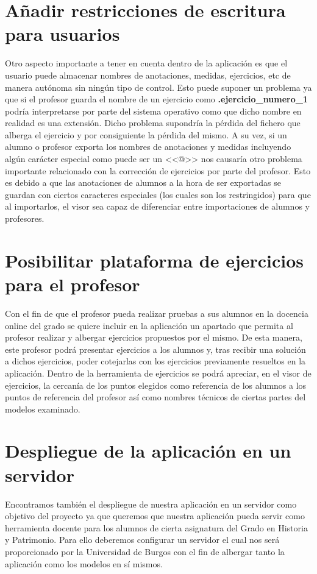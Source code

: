 \section{Añadir restricciones de escritura para usuarios}
Otro aspecto importante a tener en cuenta dentro de la aplicación es que el usuario puede almacenar nombres de anotaciones, medidas, ejercicios, etc de manera autónoma sin ningún tipo de control. Esto puede suponer un problema ya que si el profesor guarda el nombre de un ejercicio como \textbf{.ejercicio\_numero\_1} podría interpretarse por parte del sistema operativo como que dicho nombre en realidad es una extensión. Dicho problema supondría la pérdida del fichero que alberga el ejercicio y por consiguiente la pérdida del mismo. A su vez, si un alumno o profesor exporta los nombres de anotaciones y medidas incluyendo algún carácter especial como puede ser un <<@>> nos causaría otro problema importante relacionado con la corrección de ejercicios por parte del profesor. Esto es debido a que las anotaciones  de alumnos a la hora de ser exportadas se guardan con ciertos caracteres especiales (los cuales son los restringidos) para que al importarlos, el visor sea capaz de diferenciar entre importaciones de alumnos y profesores.

\section{Posibilitar plataforma de ejercicios para el profesor}
Con el fin de que el profesor pueda realizar pruebas a sus alumnos en la docencia online del grado se quiere incluir en la aplicación un apartado que permita al profesor realizar y albergar ejercicios propuestos por el mismo. De esta manera, este profesor podrá presentar ejercicios a los alumnos y, tras recibir una solución a dichos ejercicios, poder cotejarlas con los ejercicios previamente resueltos en la aplicación. Dentro de la herramienta de ejercicios se podrá apreciar, en el visor de ejercicios, la cercanía de los puntos elegidos como referencia de los alumnos a los puntos de referencia del profesor así como nombres técnicos de ciertas partes del modelos examinado.

\section{Despliegue de la aplicación en un servidor}
Encontramos también el despliegue de nuestra aplicación en un servidor como objetivo del proyecto ya que queremos que nuestra aplicación pueda servir como herramienta docente para los alumnos de cierta asignatura del Grado en Historia y Patrimonio. Para ello deberemos configurar un servidor el cual nos será proporcionado por la Universidad de Burgos con el fin de albergar tanto la aplicación como los modelos en sí mismos.

